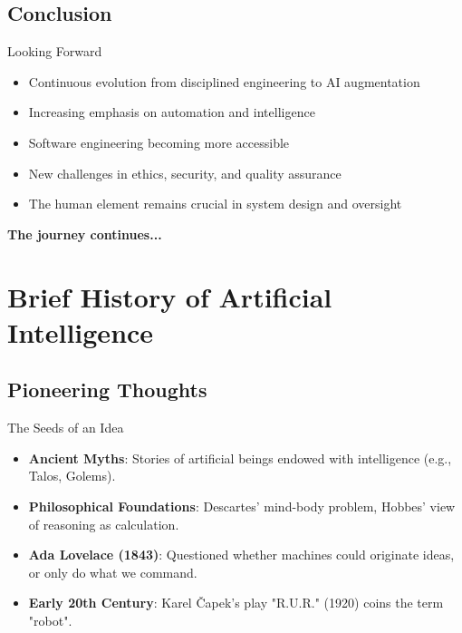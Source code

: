 \documentclass{beamer}
\begin{document}
\subsection{Conclusion}


\begin{frame}[t]{Looking Forward}
\begin{itemize}
    \item Continuous evolution from disciplined engineering to AI augmentation
    \item Increasing emphasis on automation and intelligence
    \item Software engineering becoming more accessible
    \item New challenges in ethics, security, and quality assurance
    \item The human element remains crucial in system design and oversight
\end{itemize}
\begin{center}
    \textbf{The journey continues...}
\end{center}
\end{frame}
\section{Brief History of Artificial Intelligence}
\subsection{Pioneering Thoughts}
\begin{frame}[t]{The Seeds of an Idea}
\begin{itemize}
    \item \textbf{Ancient Myths}: Stories of artificial beings endowed with intelligence (e.g., Talos, Golems).
    \item \textbf{Philosophical Foundations}: Descartes' mind-body problem, Hobbes' view of reasoning as calculation.
    \item \textbf{Ada Lovelace (1843)}: Questioned whether machines could originate ideas, or only do what we command.
    \item \textbf{Early 20th Century}: Karel Čapek's play "R.U.R." (1920) coins the term "robot".
\end{itemize}
\begin{center}
    \quad
\end{center}
\end{frame}
\end{document}
